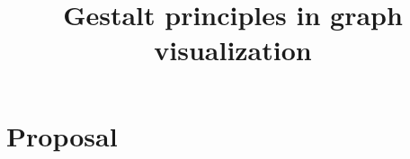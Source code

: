 \documentclass[12pt, twocolumn]{article}
\title{\vspace{-.5in}Gestalt principles in graph visualization}
\author{} %
\date{\vspace{-.7in}}
\begin{document}
\maketitle

\section{Proposal}

\end{document}
